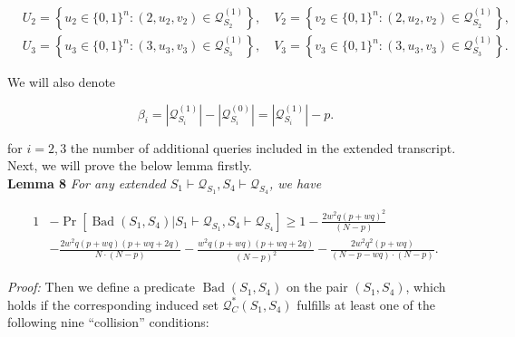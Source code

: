 $$
\begin{aligned}
&U_{2}=\left\{u_{2} \in\{0,1\}^{n}:\left(2, u_{2}, v_{2}\right) \in \mathcal{Q}_{S_{2}}^{(1)}\right\}, \quad V_{2}=\left\{v_{2} \in\{0,1\}^{n}:\left(2, u_{2}, v_{2}\right) \in \mathcal{Q}_{S_{2}}^{(1)}\right\},\\
&U_{3}=\left\{u_{3} \in\{0,1\}^{n}:\left(3, u_{3}, v_{3}\right) \in \mathcal{Q}_{S_{3}}^{(1)}\right\}, \quad V_{3}=\left\{v_{3} \in\{0,1\}^{n}:\left(3, u_{3}, v_{3}\right) \in \mathcal{Q}_{S_{3}}^{(1)}\right\}.
\end{aligned}
$$

We will also denote

$$
\beta_{i}=\left|\mathcal{Q}_{S_{i}}^{(1)}\right|-\left|\mathcal{Q}_{S_{i}}^{(0)}\right|=\left|\mathcal{Q}_{S_{i}}^{(1)}\right|-p.
$$

for $i=2, 3$ the number of additional queries included in the extended transcript.\\

Next, we will prove the below lemma firstly.\\

\noindent \textbf{Lemma 8} \emph{ For any extended $S_{1} \vdash \mathcal{Q}_{S_{1}},S_{4} \vdash \mathcal{Q}_{S_{4}}$, we have}

\begin{equation}
\begin{aligned}
1&-\operatorname{Pr}\left[\operatorname{Bad}\left(S_{1},S_{4}\right) | S_{1} \vdash \mathcal{Q}_{S_{1}},S_{4} \vdash \mathcal{Q}_{S_{4}}\right] \geq 1- \frac{2 w^{2} q (p+w q)^{2}}{(N-p)}\\
& -\frac{2 w^{2} q (p+w q)(p+w q+2 q)}{N \cdot (N-p)} - \frac{w^{2} q (p+w q)(p+w q+2 q)}{(N-p)^2} - \frac{2 w^{2} q^{2} (p+w q)}{(N- p- wq) \cdot (N-p)}.
\end{aligned}
\end{equation}

\noindent \emph{Proof:} Then we define a predicate $\operatorname{Bad}\left(S_{1},S_{4}\right)$ on the pair $(S_1, S_4)$, which holds if the corresponding induced set $\mathcal{Q}_{C}^{*}\left(S_{1}, S_{4}\right)$ fulfills at least one of the following nine ``collision'' conditions:

